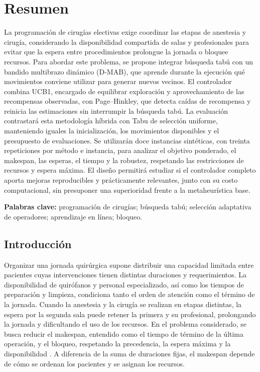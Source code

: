 \documentclass[12pt,letterpaper]{report}
\begin{document}
\hypersetup{pageanchor=false}

\hypersetup{pageanchor=true}

\chapter*{Resumen}
La programación de cirugías electivas exige coordinar las etapas de anestesia
y cirugía, considerando la disponibilidad compartida de salas y profesionales
para evitar que la espera entre procedimientos prolongue la jornada o bloquee
recursos. Para abordar este problema, se propone integrar búsqueda tabú con
un bandido multibrazo dinámico (D-MAB), que aprende durante la ejecución
qué movimientos conviene utilizar para generar nuevos vecinos. El controlador
combina UCB1, encargado de equilibrar exploración y aprovechamiento de las
recompensas observadas, con Page--Hinkley, que detecta caídas de recompensa
y reinicia las estimaciones sin interrumpir la búsqueda tabú. La evaluación
contrastará esta metodología híbrida con Tabu de selección uniforme,
manteniendo iguales la inicialización, los movimientos disponibles y el
presupuesto de evaluaciones. Se utilizarán doce instancias sintéticas,
con treinta repeticiones por método e instancia, para analizar el objetivo
ponderado, el makespan, las esperas, el tiempo y la robustez,
respetando las restricciones de recursos y espera máxima. El diseño
permitirá estudiar si el controlador completo aporta mejoras reproducibles
y prácticamente relevantes, junto con su costo computacional, sin
presuponer una superioridad frente a la metaheurística base.

\noindent\textbf{Palabras clave:} programación de cirugías; búsqueda tabú;
selección adaptativa de operadores; aprendizaje en línea; bloqueo.

\clearpage
\section{Introducción}
Organizar una jornada quirúrgica supone distribuir una capacidad limitada
entre pacientes cuyas intervenciones tienen distintas duraciones y
requerimientos. La disponibilidad de quirófanos y personal especializado,
así como los tiempos de preparación y limpieza, condiciona tanto el orden
de atención como el término de la jornada. Cuando la anestesia y la cirugía se realizan en
etapas distintas, la espera por la segunda sala puede retener la primera
y su profesional, prolongando la jornada y dificultando el uso de los
recursos. En el problema considerado, se busca reducir el makespan,
entendido como el tiempo de término de la última operación, y el bloqueo,
respetando la precedencia, la espera máxima y la disponibilidad
\parencite{lara2026}. A diferencia de la suma de duraciones fijas, el
makespan depende de cómo se ordenan los pacientes y se asignan los recursos.
\end{document}
